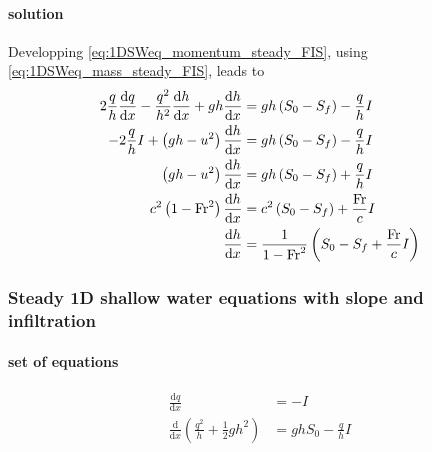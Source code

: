 \paragraph{solution} 
Developping \eqref{eq:1DSWeq_momentum_steady_FIS}, using \eqref{eq:1DSWeq_mass_steady_FIS}, leads to
\begin{align}
\displaystyle{2\frac{q}{h}\frac{\mathrm{d}q}{\mathrm{d}x} - \frac{q^2}{h^2}\frac{\mathrm{d}h}{\mathrm{d}x}+gh\frac{\mathrm{d}h}{\mathrm{d}x}} & = gh\left(S_0 - S_f\right)  - \displaystyle{\frac{q}{h}} I \nonumber\\
\displaystyle{-2\frac{q}{h}I + \left(gh - u^2\right)\frac{\mathrm{d}h}{\mathrm{d}x}}& = gh\left(S_0 - S_f\right)  - \displaystyle{\frac{q}{h}} I\nonumber\\
\displaystyle{\left(gh - u^2\right)\frac{\mathrm{d}h}{\mathrm{d}x}}& = gh\left(S_0 - S_f\right) + \displaystyle{\frac{q}{h}I}\nonumber\\
\displaystyle{c^2\left(1 - \mathrm{Fr}^2\right)\frac{\mathrm{d}h}{\mathrm{d}x}}& = c^2\left(S_0 - S_f\right) + \displaystyle{\frac{\mathrm{Fr}}{c}I}\nonumber\\
\displaystyle{\frac{\mathrm{d}h}{\mathrm{d}x}}& = \displaystyle{\frac{1}{1 - \mathrm{Fr}^2}}\left(S_0 - S_f + \displaystyle{\frac{\mathrm{Fr}}{c}I}\right) \label{eq:1DSWeq_momentum_steady_FIS_ODE}
\end{align}


\subsubsection{Steady 1D shallow water equations with slope and infiltration}
\paragraph{set of equations}
\begin{subequations}
\label{eq:1DSWeq_steady_IS}
\begin{align}
\displaystyle{\frac{\mathrm{d} q}{\mathrm{d}x}} &= -I \label{eq:1DSWeq_mass_steady_IS}\\
\displaystyle{\frac{\mathrm{d}}{\mathrm{d} x}\left(\frac{q^2}{h}+\frac{1}{2}gh^2\right)}&=ghS_0 - \frac{q}{h} I \label{eq:1DSWeq_momentum_steady_IS}
\end{align}
\end{subequations}

